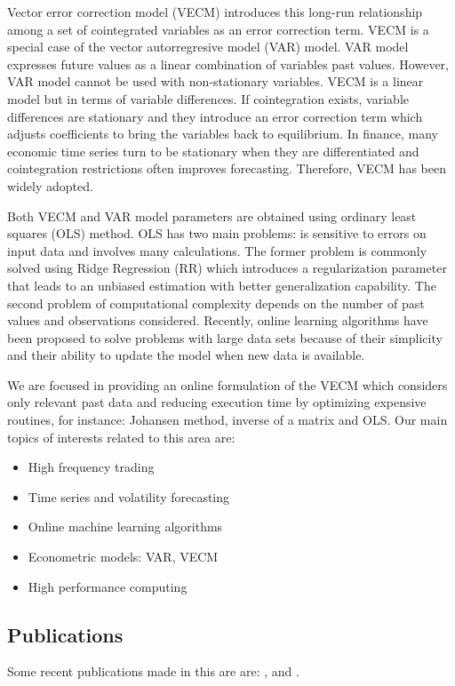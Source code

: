 Vector error correction model (VECM) introduces this long-run relationship among
a set of cointegrated variables as an error correction term. VECM is a special
case of the vector autorregresive model (VAR) model. VAR model expresses future
values as a linear combination of variables past values.  However, VAR model
cannot be used with non-stationary variables. VECM is a linear model but in
terms of variable differences. If cointegration exists, variable differences are
stationary and they introduce an error correction term which adjusts
coefficients to bring the variables back to equilibrium. In finance, many
economic time series turn to be stationary when they are differentiated and
cointegration restrictions often improves forecasting. Therefore, VECM has been
widely adopted.

Both VECM and VAR model parameters are obtained using ordinary least squares
(OLS) method. OLS has two main problems: is sensitive to errors on input data
and involves many calculations. The former problem is commonly solved using
Ridge Regression (RR) which introduces a regularization parameter that leads to
an unbiased estimation with better generalization capability. The second problem
of computational complexity depends on the number of past values and
observations considered.  Recently, online learning algorithms have been
proposed to solve problems with large data sets because of their simplicity and
their ability to update the model when new data is available. 

We are focused in providing an online formulation of the VECM which considers
only relevant past data and reducing execution time by optimizing expensive
routines, for instance: Johansen method, inverse of a matrix and OLS.  Our main
topics of interests related to this area are:

\begin{itemize}
\item High frequency trading
\item Time series and volatility forecasting
\item Online machine learning algorithms
\item Econometric models: VAR, VECM
\item High performance computing
\end{itemize}


\subsection{Publications}
Some recent publications made in this are are: \cite{arceetAl2015},
\cite{arce+salinas2012} and \cite{arceetAl2012}.

